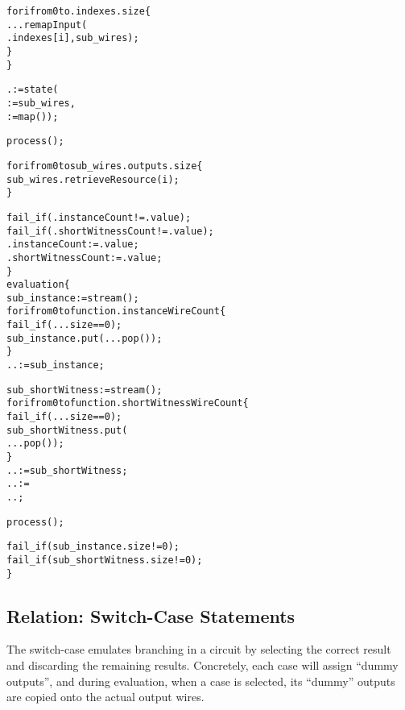 \begin{alltt}
      for i from 0 to .indexes.size \{
        ...remapInput(
          .indexes[i], sub_wires);
      \}
    \}

    . := state(
       := sub_wires,
       := map());
    
    process();

    for i from 0 to sub_wires.outputs.size \{
      sub_wires.retrieveResource(i);
    \}

    fail_if(.instanceCount != .value);
    fail_if(.shortWitnessCount != .value);
    .instanceCount := .value;
    .shortWitnessCount := .value;
  \}
  evaluation \{
    sub_instance := stream();
    for i from 0 to function.instanceWireCount \{
      fail_if(...size == 0);
      sub_instance.put(...pop());
    \}
    .. := sub_instance;
    
    sub_shortWitness := stream();
    for i from 0 to function.shortWitnessWireCount \{
      fail_if(...size == 0);
      sub_shortWitness.put(
        ...pop());
    \}
    .. := sub_shortWitness;
    .. :=
      ..;

    process();

    fail_if(sub_instance.size != 0);
    fail_if(sub_shortWitness.size != 0);
  \}
\end{alltt}

\subsection{Relation: Switch-Case Statements}\label{switch_case_text}
The switch-case emulates branching in  a circuit by selecting the correct result and discarding the remaining results.
Concretely, each case will assign ``dummy outputs'', and during evaluation, when a case is selected, its ``dummy'' outputs are copied onto the actual output wires.\\

